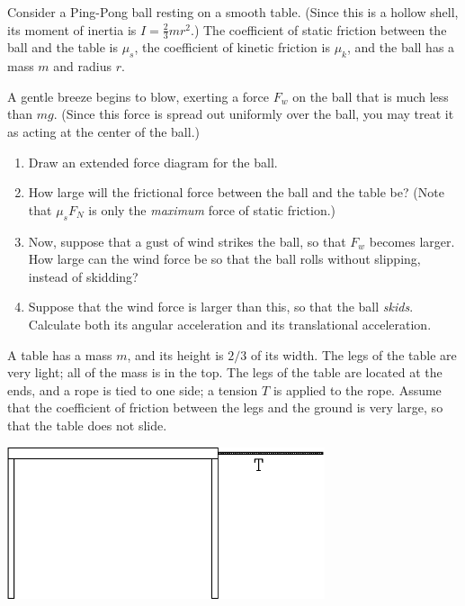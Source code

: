 \documentclass[12pt]{article}
\begin{document}
Consider a Ping-Pong ball resting on a smooth table. (Since this is a hollow shell, its moment of inertia is 
$I=\frac{2}{3}mr^2$.) The coefficient of static friction between the ball and the table is $\mu_s$, 
the coefficient of kinetic friction is $\mu_k$, and the 
ball has a mass $m$ and radius $r$.

A gentle breeze begins to blow, exerting a force $F_w$ on the ball that is much less than $mg$. (Since this force is spread out uniformly over the ball,
you may treat it as acting at the center of the ball.)

\begin{enumerate}

\item Draw an extended force diagram for the ball.

\vspace{4in}

\newpage

\item How large will the frictional force between the ball and the table be? (Note that $\mu_s F_N$ is only the 
{\it maximum} force of static friction.)

\vspace{3in}

\item Now, suppose that a gust of wind strikes the ball, so that $F_w$ becomes larger. How large can the wind force
be so that the ball rolls without slipping, instead of skidding?

\vspace{2in}

\item Suppose that the wind force is larger than this, so that the ball {\it skids}. Calculate both its angular
acceleration and its translational acceleration.
\end{enumerate}

\newpage

\begin{minipage}{0.5\textwidth}
A table has a mass $m$, and its height is $2/3$ of its width. The legs of the table are very light; all of the mass is in the top.
The legs of the table are located at the ends, and a rope is tied to one side; a tension $T$ is applied to the rope. Assume that the coefficient of friction between
the legs and the ground is very large, so that the table does not slide.
\end{minipage}
\begin{minipage}{0.5\textwidth}
\begin{center}
\includegraphics[width=0.7\textwidth]{table-crop.pdf}
\end{center}
\end{minipage}
\end{document}
